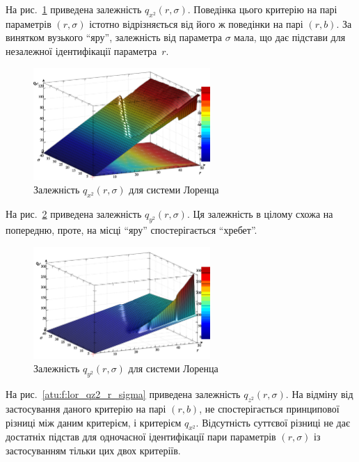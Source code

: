 На рис.~\ref{atu:f:lor_qx2_r_sigma} приведена залежність
$q_{x^2}(r,\sigma)$.
Поведінка цього критерію на парі параметрів
$ (r, \sigma) $ істотно відрізняється від його ж поведінки на парі
$ (r, b) $. За винятком вузького ``яру'', залежність від параметра
$ \sigma $ мала, що дає підстави для незалежної ідентифікації
параметра~$r$.

\begin{figure}[ht!]
  \centerline{  \includegraphics[width=0.60\textwidth]{p/cha/lor/q2d/lor_qx2_r_sigma.png}  }
  \caption{Залежність $ q_{x^2} (r, \sigma) $ для системи Лоренца}
  \label{atu:f:lor_qx2_r_sigma}
\end{figure}


На рис.~\ref{atu:f:lor_qy2_r_sigma} приведена залежність
$q_{y^2}(r,\sigma)$.
Ця залежність в цілому схожа на попередню, проте, на місці ``яру'' спостерігається ``хребет''.

\begin{figure}[ht!]
  \centerline{  \includegraphics[width=0.60\textwidth]{p/cha/lor/q2d/lor_qy2_r_sigma.png}  }
  \caption{Залежність $ q_{y^2} (r, \sigma) $ для системи Лоренца}
  \label{atu:f:lor_qy2_r_sigma}
\end{figure}

На рис.~\ref{atu:f:lor_qz2_r_sigma} приведена залежність
$ q_{z^2} (r, \sigma) $. На відміну від застосування даного критерію
на парі
$ (r, b) $, не спостерігається принципової різниці між даним
критерієм, і критерієм
$ q_{x^2} $. Відсутність суттєвої різниці не дає достатніх підстав
для одночасної ідентифікації пари параметрів
$ (r, \sigma) $ із застосуванням тільки цих двох критеріїв.

